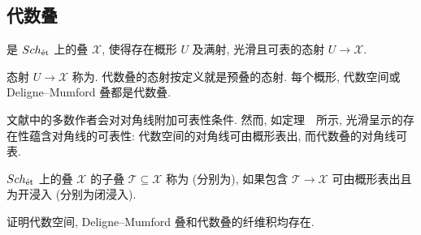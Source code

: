 \subsection{代数叠}\label{src:4.1.3-subsection}
\begin{definition}[代数叠]\label{src:4.1.6}
是 $Sch_{\text{ét}}$ 上的叠 $\mathcal X$, 使得存在概形 $U$ 及满射, 光滑且可表的态射 $U\to\mathcal X$.

态射 $U\to\mathcal X$ 称为. 代数叠的态射按定义就是预叠的态射. 每个概形, 代数空间或 Deligne--Mumford 叠都是代数叠.
\end{definition}
\begin{caution}\label{src:4.1.7}
文献中的多数作者会对对角线附加可表性条件. 然而, 如定理~~所示, 光滑呈示的存在性蕴含对角线的可表性: 代数空间的对角线可由概形表出, 而代数叠的对角线可表.
\end{caution}
\begin{definition}[开子叠与闭子叠]\label{src:4.1.8}
$Sch_{\text{ét}}$ 上的叠 $\mathcal X$ 的子叠 $\mathcal T\subseteq\mathcal X$ 称为 (分别为), 如果包含 $\mathcal T\to\mathcal X$ 可由概形表出且为开浸入 (分别为闭浸入).
\end{definition}
\begin{exercise}[纤维积]\label{src:4.1.9}
证明代数空间, Deligne--Mumford 叠和代数叠的纤维积均存在.
\end{exercise}


